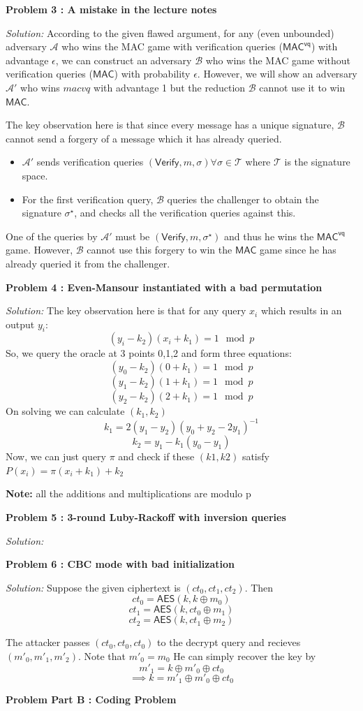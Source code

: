 \documentclass[a4paper, 11pt]{article}
\newenvironment{solution}
    {\textit{Solution:}}
    {\clearpage}
\newcommand{\prob}[1]{\begin{mdframed}[backgroundcolor=gray!20] \textbf{Problem #1}\end{mdframed}}
\newcommand{\verify}{\mathsf{Verify}}
\newcommand{\macvq}{\mathsf{MAC^{vq}}}
\newcommand{\mac}{\mathsf{MAC}}
\newcommand{\AES}{\mathsf{AES}}
\newcommand{\calA}{\mathcal{A}}
\newcommand{\calB}{\mathcal{B}}
\newcommand{\calT}{\mathcal{T}}
\begin{document}
\prob{3 : A mistake in the lecture notes}
\begin{solution}
    According to the given flawed argument, for any (even unbounded) adversary $\calA$ who wins the MAC game with verification queries ($\macvq$) with advantage $\epsilon$, we can construct an adversary $\calB$ who wins the MAC game without verification queries ($\mac$) with probability $\epsilon$. However, we will show an adversary $\calA'$ who wins  $macvq$ with advantage 1 but the reduction $\calB$ cannot use it to win $\mac$.

    The key observation here is that since every message has a unique signature, $\calB$ cannot send a forgery of a message which it has already queried. 
    \begin{itemize}
        \item $\calA'$ sends verification queries $(\verify , m, \sigma) \forall \sigma\in\calT$ where $\calT$ is the signature space.
        \item For the first verification query, $\calB$ queries the challenger to obtain the signature $\sigma^\star$, and checks all the verification queries against this.
    \end{itemize} 
    One of the queries by $\calA'$ must be $(\verify , m, \sigma^\star)$ and thus he wins the $\macvq$ game. However, $\calB$ cannot use this forgery to win the $\mac$ game since he has already queried it from the challenger.

\end{solution}


\prob{4 : Even-Mansour instantiated with a bad permutation}
\begin{solution}
   The key observation here is that for any query $x_i$ which results in an output $y_i$:
   $$(y_i-k_2)(x_i+k_1)=1 \mod p$$
   So, we query the oracle at 3 points 0,1,2 and form three equations:
   $$(y_0-k_2)(0+k_1)=1 \mod p$$
   $$(y_1-k_2)(1+k_1)=1 \mod p$$
   $$(y_2-k_2)(2+k_1)=1 \mod p$$
   On solving we can calculate $(k_1,k_2)$
   $$k_1=2(y_1-y_2)(y_0+y_2-2y_1)^{-1}$$
   $$k_2=y_1-k_1(y_0-y_1)$$
   Now, we can just query $\pi$ and check if these $(k1,k2)$ satisfy $P(x_i)=\pi(x_i+k_1)+k_2$
   
   \noindent\textbf{Note:} all the additions and multiplications are modulo p
\end{solution}


\prob{5 : 3-round Luby-Rackoff with inversion queries}
\begin{solution}
   
\end{solution}


\prob{6 : CBC mode with bad initialization}
\begin{solution}
   Suppose the given ciphertext is $(ct_0, ct_1, ct_2)$. Then 
   $$ct_0=\AES(k,k\oplus m_0)$$
   $$ct_1=\AES(k,ct_0\oplus m_1)$$
   $$ct_2=\AES(k,ct_1\oplus m_2)$$
   
   The attacker passes $(ct_0, ct_0, ct_0)$ to the decrypt query and recieves $(m'_0,m'_1,m'_2)$. Note that $m'_0=m_0$ He can simply recover the key by 
   $$m'_1=k\oplus m'_0\oplus ct_0$$
   $$\implies k=m'_1\oplus m'_0\oplus ct_0$$
\end{solution}


\prob{Part B : Coding Problem}
\end{document}
